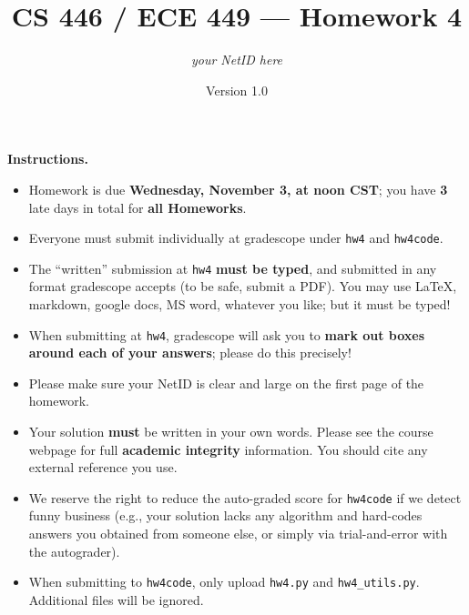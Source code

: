 \documentclass{article}
\title{CS 446 / ECE 449 --- Homework 4}
\author{\emph{your NetID here}}
\date{Version 1.0}
\theoremstyle{definition}
\theoremstyle{remark}
\begin{document}
\maketitle

\noindent\textbf{Instructions.}
\begin{itemize}
   \item
            Homework is due \textbf{Wednesday, November 3, at noon CST}; you have \textbf{3} late days in total for \textbf{all Homeworks}.
        
          \item
            Everyone must submit individually at gradescope under \texttt{hw4} and \texttt{hw4code}.
        
          \item
            The ``written'' submission at \texttt{hw4} \textbf{must be typed}, and submitted in
            any format gradescope accepts (to be safe, submit a PDF).  You may use \LaTeX, markdown,
            google docs, MS word, whatever you like; but it must be typed!
        
          \item
            When submitting at \texttt{hw4}, gradescope will ask you to \textbf{mark out boxes
            around each of your answers}; please do this precisely!
        
          \item
            Please make sure your NetID is clear and large on the first page of the homework.
        
          \item
            Your solution \textbf{must} be written in your own words.
            Please see the course webpage for full \textbf{academic integrity} information.
            You should cite any external reference you use.
        
          \item
            We reserve the right to reduce the auto-graded score for
            \texttt{hw4code} if we detect funny business (e.g., your solution
            lacks any algorithm and hard-codes answers you obtained from
            someone else, or simply via trial-and-error with the autograder).
            
          \item
           When submitting to \texttt{hw4code}, only upload \texttt{hw4.py} and \texttt{hw4\_utils.py}. Additional files will be ignored.
        
\end{itemize}
        
       
\begin{enumerate}[font={\Large\bfseries},left=0pt]




 
\end{enumerate}
\end{document}

